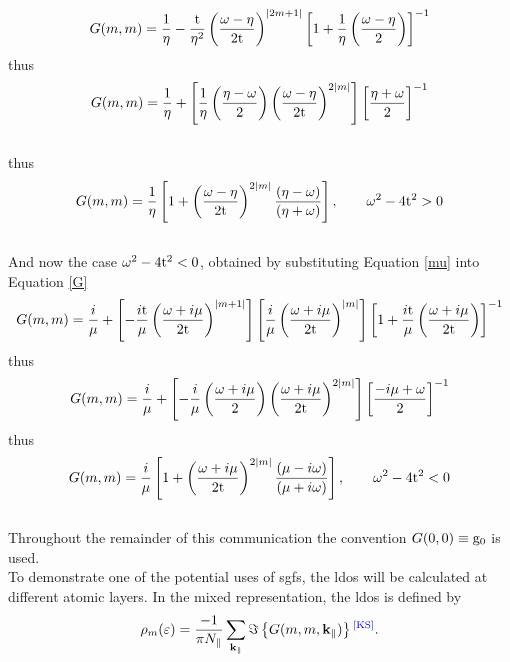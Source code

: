 \documentclass[a4paper, 12pt]{article}
\newcommand{\site}[1]{\textsuperscript{\textcolor{blue}{\cite{#1}}}}
\begin{document}
\begin{equation}
G(m,m)= \frac{1}{\eta}-\frac{\rm t}{\eta^2}\left(\frac{\omega -\eta}{2\rm t}\right)^{|2m+1|}\left[1+\frac{1}{\eta}\left(\frac{\omega -\eta}{2}\right)\right]^{-1}
\end{equation}
thus
\begin{equation}
G(m,m)= \frac{1}{\eta}+\left[ \frac{1}{\eta}\left(\frac{\eta -\omega}{2}\right)\left(\frac{\omega -\eta}{2\rm t}\right)^{2|m|}\right]\left[\frac{\eta+\omega}{2}\right]^{-1}
\end{equation}
\\
thus
\begin{equation}
	G(m,m)= \frac{1}{\eta}\left[1+\left(\frac{\omega -\eta}{2\rm t}\right)^{2|m|}\frac{\left(\eta-\omega\right)}{\left(\eta+\omega\right)}\right] , \qquad \omega^2 -4{\rm t}^2>0
\end{equation}
\\
And now the case $\omega^2-4{\rm t}^2<0$, obtained by substituting Equation \eqref{mu} into Equation \eqref{G}
\begin{equation}
G(m,m)= \frac{i}{\mu}+\left[ -\frac{i\rm t}{\mu}\left(\frac{\omega +i\mu}{2\rm t}\right)^{|m+1|}\right]\left[\frac{i}{\mu}\left(\frac{\omega +i\mu}{2\rm t}\right)^{|m|}\right]\left[1+\frac{i\rm t}{\mu}\left(\frac{\omega +i\mu}{2\rm t}\right)\right]^{-1}
\end{equation}
thus
\begin{equation}
G(m,m)= \frac{i}{\mu}+\left[ -\frac{i}{\mu}\left(\frac{\omega+i\mu}{2}\right)\left(\frac{\omega +i\mu}{2\rm t}\right)^{2|m|}\right]\left[\frac{-i\mu +\omega}{2}\right]^{-1}
\end{equation}
thus
\begin{equation}
	G(m,m)= \frac{i}{\mu}\left[1+\left(\frac{\omega +i\mu}{2\rm t}\right)^{2|m|}\frac{\left(\mu-i\omega\right)}{\left(\mu+i\omega\right)}\right], \qquad \omega^2-4{\rm t}^2<0
\end{equation}
\\
Throughout the remainder of this communication the convention $ G(0,0)\equiv {\rm{g_0}}$ is used.
\\[2mm]To demonstrate one of the potential uses of \gls{sgf}s, the \acrfull{ldos} will be calculated at different atomic layers.
In the mixed representation, the \gls{ldos} is defined by
\begin{equation}\label{rho}
	\rho_m(\varepsilon)=\frac{-1}{\pi N_\parallel}\sum_{\bf k_\parallel} \Im\left\{ G(m,m,{\bf k_\parallel})\right\}\site{KS}.
\end{equation}
\end{document}
